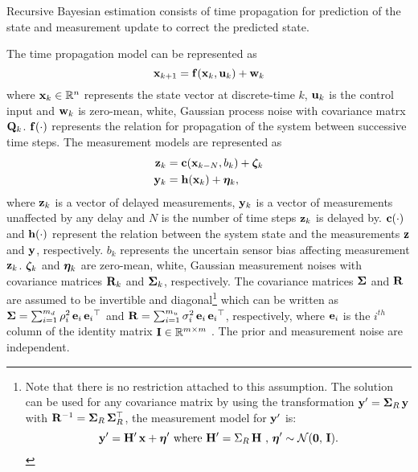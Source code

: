 

Recursive Bayesian estimation consists of time propagation for prediction of the state and measurement update to correct the predicted state.

The time propagation model can be represented as
\begin{equation}
	\mathbf{x}_{k+1} = \mathbf{f}(\mathbf{x}_k, \mathbf{u}_k) + \mathbf{w}_k
\end{equation}
where $\mathbf{x}_k \in\mathbb{R}^n$ represents the state vector at discrete-time $k$, $\mathbf{u}_k$ is the control input and $\mathbf{w}_k$ is zero-mean, white, Gaussian process noise with covariance matrx $\mathbf{Q}_k$. $\mathbf{f} (\cdot)$ represents the relation for propagation of the system between successive time steps.
The measurement models are represented as
\begin{align} 
	\label{eqn:DelayedMeasurementModel}
	\mathbf{z}_{k} &= \mathbf{c} (\mathbf{x}_{k-N}, b_k) + \boldsymbol{\zeta}_k \\
	\label{eqn:UndelayedMeasurementModel}
	\mathbf{y}_{k} &= \mathbf{h} (\mathbf{x}_{k}) + \boldsymbol{\eta}_k,
\end{align}
where $\mathbf{z}_k$ is a vector of delayed measurements, $\mathbf{y}_k$ is a vector of measurements unaffected by any delay and $N$ is the number of time steps $\mathbf{z}_k$ is delayed by. 
$\mathbf{c}(\cdot)$ and $\mathbf{h}(\cdot)$ represent the relation between the system state and the measurements $\mathbf{z}$ and $\mathbf{y}$, respectively.
$b_k$ represents the uncertain sensor bias affecting measurement $\mathbf{z}_k$.
$\boldsymbol{\zeta}_k$ and $\boldsymbol{\eta}_k$ are zero-mean, white, Gaussian measurement noises with covariance matrices $\mathbf{R}_k$ and $\boldsymbol{\Sigma}_k$, respectively.
The covariance matrices $\boldsymbol{\Sigma}$ and $\mathbf{R}$ are assumed to be invertible and diagonal\footnote
{\label{ftnt:R_assumption}
	Note that there is no restriction attached to this assumption. The solution can be used for any  covariance matrix by using the transformation $\mathbf{y}' =\boldsymbol{\Sigma}_R  \, \mathbf{y}$ with $\mathbf{R}^{-1} = \boldsymbol{\Sigma}_R \, \boldsymbol{\Sigma}_R^\top$, the measurement model for $\mathbf{y}'$ is:
	$$\mathbf{y}'=\mathbf{H}' \,\mathbf{x}+\boldsymbol{\eta}' \mbox{ where } \mathbf{H}' = \Sigma_R  \, \mathbf{H} \mbox{ , } \boldsymbol{\eta}' \sim \mathcal{N}(\boldsymbol{0},\,\mathbf{I}).$$
} 
which can be written as $\boldsymbol{\Sigma} = \sum_{i=1}^{m_d} \rho_{i}^2 \, \mathbf{e}_i  \,{\mathbf{e}_i}^\top$ and $\mathbf{R} = \sum_{i=1}^{m_u} \sigma_{i}^2 \, \mathbf{e}_i  \,{\mathbf{e}_i}^\top$, respectively, where $\mathbf{e}_i$ is the $i^{th}$ column of the identity matrix $\mathbf{I} \in \mathbb{R}^{m \times m}$ .
The prior and measurement noise are independent.

